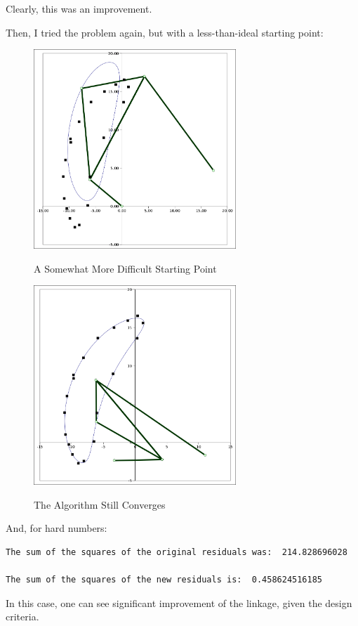 \documentclass[12pt, letterpaper]{article}
\begin{document}
Clearly, this was an improvement.

Then, I tried the problem again, but with a less-than-ideal starting point:

\begin{figure}[H]
\centering
\caption{A Somewhat More Difficult Starting Point}
\includegraphics[width=3.0in]{medium_problem}
\label{fig:medium_problem}
\end{figure}

\begin{figure}[H]
\centering
\caption{The Algorithm Still Converges}
\includegraphics[width=3.0in]{medium_solution}
\label{fig:medium_solution}
\end{figure}

And, for hard numbers:
\begin{verbatim}
The sum of the squares of the original residuals was:  214.828696028

The sum of the squares of the new residuals is:  0.458624516185
\end{verbatim}

In this case, one can see significant improvement of the linkage, given the design criteria.
\end{document}
